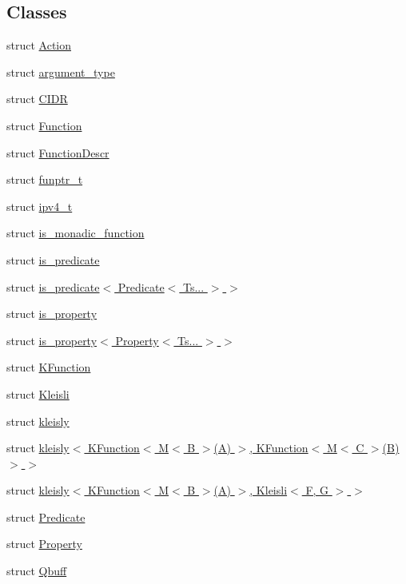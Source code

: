 \subsection*{Classes}
\begin{DoxyCompactItemize}
\item 
struct \hyperlink{structpfq_1_1lang_1_1Action}{Action}
\item 
struct \hyperlink{structpfq_1_1lang_1_1argument__type}{argument\+\_\+type}
\item 
struct \hyperlink{structpfq_1_1lang_1_1CIDR}{C\+I\+DR}
\item 
struct \hyperlink{structpfq_1_1lang_1_1Function}{Function}
\item 
struct \hyperlink{structpfq_1_1lang_1_1FunctionDescr}{Function\+Descr}
\item 
struct \hyperlink{structpfq_1_1lang_1_1funptr__t}{funptr\+\_\+t}
\item 
struct \hyperlink{structpfq_1_1lang_1_1ipv4__t}{ipv4\+\_\+t}
\item 
struct \hyperlink{structpfq_1_1lang_1_1is__monadic__function}{is\+\_\+monadic\+\_\+function}
\item 
struct \hyperlink{structpfq_1_1lang_1_1is__predicate}{is\+\_\+predicate}
\item 
struct \hyperlink{structpfq_1_1lang_1_1is__predicate_3_01Predicate_3_01Ts_8_8_8_01_4_01_4}{is\+\_\+predicate$<$ Predicate$<$ Ts... $>$ $>$}
\item 
struct \hyperlink{structpfq_1_1lang_1_1is__property}{is\+\_\+property}
\item 
struct \hyperlink{structpfq_1_1lang_1_1is__property_3_01Property_3_01Ts_8_8_8_01_4_01_4}{is\+\_\+property$<$ Property$<$ Ts... $>$ $>$}
\item 
struct \hyperlink{structpfq_1_1lang_1_1KFunction}{K\+Function}
\item 
struct \hyperlink{structpfq_1_1lang_1_1Kleisli}{Kleisli}
\item 
struct \hyperlink{structpfq_1_1lang_1_1kleisly}{kleisly}
\item 
struct \hyperlink{structpfq_1_1lang_1_1kleisly_3_01KFunction_3_01M_3_01B_01_4_07A_08_01_4_00_01KFunction_3_01M_3_01C_01_4_07B_08_4_01_4}{kleisly$<$ K\+Function$<$ M$<$ B $>$(\+A) $>$, K\+Function$<$ M$<$ C $>$(\+B)$>$ $>$}
\item 
struct \hyperlink{structpfq_1_1lang_1_1kleisly_3_01KFunction_3_01M_3_01B_01_4_07A_08_01_4_00_01Kleisli_3_01F_00_01G_01_4_01_4}{kleisly$<$ K\+Function$<$ M$<$ B $>$(\+A) $>$, Kleisli$<$ F, G $>$ $>$}
\item 
struct \hyperlink{structpfq_1_1lang_1_1Predicate}{Predicate}
\item 
struct \hyperlink{structpfq_1_1lang_1_1Property}{Property}
\item 
struct \hyperlink{structpfq_1_1lang_1_1Qbuff}{Qbuff}
\end{DoxyCompactItemize}

